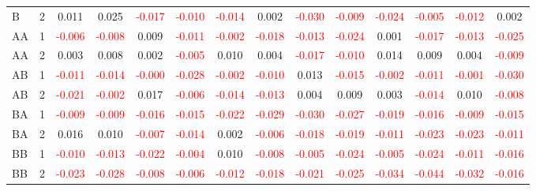 \begin{table}[!htb]
{\begin{tabular}{llcccccccccccc}
B & 2 & 0.011 & 0.025 & \textcolor{red}{-0.017} & \textcolor{red}{-0.010} & \textcolor{red}{-0.014} & 0.002 & \textcolor{red}{-0.030} & \textcolor{red}{-0.009} & \textcolor{red}{-0.024} & \textcolor{red}{-0.005} & \textcolor{red}{-0.012} & 0.002\\
AA & 1 & \textcolor{red}{-0.006} & \textcolor{red}{-0.008} & 0.009 & \textcolor{red}{-0.011} & \textcolor{red}{-0.002} & \textcolor{red}{-0.018} & \textcolor{red}{-0.013} & \textcolor{red}{-0.024} & 0.001 & \textcolor{red}{-0.017} & \textcolor{red}{-0.013} & \textcolor{red}{-0.025}\\
AA & 2 & 0.003 & 0.008 & 0.002 & \textcolor{red}{-0.005} & 0.010 & 0.004 & \textcolor{red}{-0.017} & \textcolor{red}{-0.010} & 0.014 & 0.009 & 0.004 & \textcolor{red}{-0.009}\\
AB & 1 & \textcolor{red}{-0.011} & \textcolor{red}{-0.014} & \textcolor{red}{-0.000} & \textcolor{red}{-0.028} & \textcolor{red}{-0.002} & \textcolor{red}{-0.010} & 0.013 & \textcolor{red}{-0.015} & \textcolor{red}{-0.002} & \textcolor{red}{-0.011} & \textcolor{red}{-0.001} & \textcolor{red}{-0.030}\\
AB & 2 & \textcolor{red}{-0.021} & \textcolor{red}{-0.002} & 0.017 & \textcolor{red}{-0.006} & \textcolor{red}{-0.014} & \textcolor{red}{-0.013} & 0.004 & 0.009 & 0.003 & \textcolor{red}{-0.014} & 0.010 & \textcolor{red}{-0.008}\\
BA & 1 & \textcolor{red}{-0.009} & \textcolor{red}{-0.009} & \textcolor{red}{-0.016} & \textcolor{red}{-0.015} & \textcolor{red}{-0.022} & \textcolor{red}{-0.029} & \textcolor{red}{-0.030} & \textcolor{red}{-0.027} & \textcolor{red}{-0.019} & \textcolor{red}{-0.016} & \textcolor{red}{-0.009} & \textcolor{red}{-0.015}\\
BA & 2 & 0.016 & 0.010 & \textcolor{red}{-0.007} & \textcolor{red}{-0.014} & 0.002 & \textcolor{red}{-0.006} & \textcolor{red}{-0.018} & \textcolor{red}{-0.019} & \textcolor{red}{-0.011} & \textcolor{red}{-0.023} & \textcolor{red}{-0.023} & \textcolor{red}{-0.011}\\
BB & 1 & \textcolor{red}{-0.010} & \textcolor{red}{-0.013} & \textcolor{red}{-0.022} & \textcolor{red}{-0.004} & 0.010 & \textcolor{red}{-0.008} & \textcolor{red}{-0.005} & \textcolor{red}{-0.024} & \textcolor{red}{-0.005} & \textcolor{red}{-0.024} & \textcolor{red}{-0.011} & \textcolor{red}{-0.016}\\
BB & 2 & \textcolor{red}{-0.023} & \textcolor{red}{-0.028} & \textcolor{red}{-0.008} & \textcolor{red}{-0.006} & \textcolor{red}{-0.012} & \textcolor{red}{-0.018} & \textcolor{red}{-0.021} & \textcolor{red}{-0.025} & \textcolor{red}{-0.034} & \textcolor{red}{-0.044} & \textcolor{red}{-0.032} & \textcolor{red}{-0.016}\\

\end{tabular}}
\end{table}
